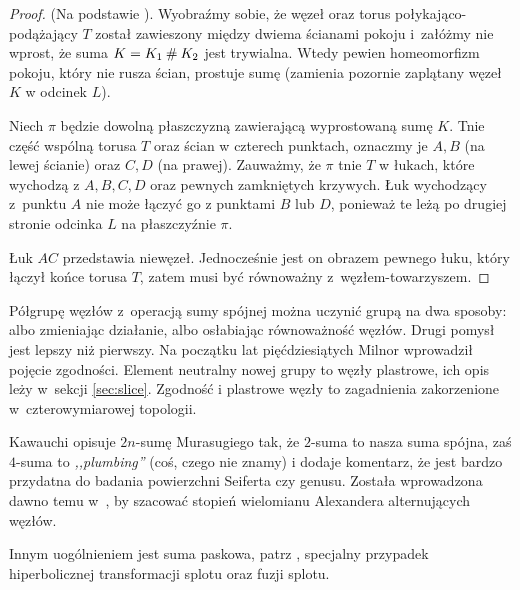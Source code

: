 \begin{proof}
    (Na podstawie \cite[s. 18-20]{kauffman1995}).
    Wyobraźmy sobie, że węzeł oraz torus połykająco-podążający $T$ został zawieszony między dwiema ścianami pokoju i~załóżmy nie wprost, że suma $K = K_1 \mathbin{\#} K_2$ jest trywialna.
    Wtedy pewien homeomorfizm pokoju, który nie rusza ścian, prostuje sumę (zamienia pozornie zaplątany węzeł $K$ w odcinek $L$). 

    Niech $\pi$ będzie dowolną płaszczyzną zawierającą wyprostowaną sumę $K$.
    Tnie część wspólną torusa $T$ oraz ścian w czterech punktach, oznaczmy je $A, B$ (na lewej ścianie) oraz $C, D$ (na prawej).
    Zauważmy, że $\pi$ tnie $T$ w łukach, które wychodzą z $A, B, C, D$ oraz pewnych zamkniętych krzywych.
    Łuk wychodzący z~punktu $A$ nie może łączyć go z punktami $B$ lub $D$, ponieważ te leżą po drugiej stronie odcinka $L$ na płaszczyźnie $\pi$.
    
    Łuk $AC$ przedstawia niewęzeł.
    Jednocześnie jest on obrazem pewnego łuku, który łączył końce torusa $T$, zatem musi być równoważny z~węzłem-towarzyszem.
\end{proof}

Półgrupę węzłów z~operacją sumy spójnej można uczynić grupą na dwa sposoby: albo zmieniając działanie, albo osłabiając równoważność węzłów.
Drugi pomysł jest lepszy niż pierwszy.
Na początku lat pięćdziesiątych Milnor wprowadził pojęcie zgodności.
%
%
Element neutralny nowej grupy to węzły plastrowe, ich opis leży w~sekcji \ref{sec:slice}.
Zgodność i plastrowe węzły to zagadnienia zakorzenione w~czterowymiarowej topologii.

Kawauchi \cite[s. 50-53]{kawauchi1996} opisuje $2n$-sumę Murasugiego tak, że $2$-suma to nasza suma spójna, zaś $4$-suma to \emph{,,plumbing''} (coś, czego nie znamy) i dodaje komentarz, że jest bardzo przydatna do badania powierzchni Seiferta czy genusu.
%
%
Została wprowadzona dawno temu w~\cite{murasugi1958}, by szacować stopień wielomianu Alexandera alternujących węzłów.
%
%
%

Innym uogólnieniem jest suma paskowa, patrz \cite[s. 31-32, 43]{kawauchi1996}, specjalny przypadek hiperbolicznej transformacji splotu oraz fuzji splotu.
%


